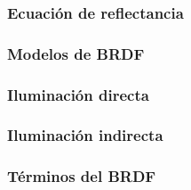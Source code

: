         \subsubsection{Ecuaci\'on de reflectancia}
        \subsubsection{Modelos de BRDF}
        \subsubsection{Iluminaci\'on directa}
        \subsubsection{Iluminaci\'on indirecta}

        \subsubsection{T\'erminos del BRDF}
        \newpage